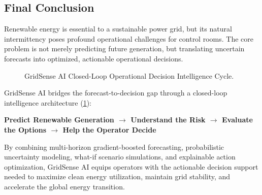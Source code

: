 \subsection{Final Conclusion}
\label{subsec:final_conclusion}

Renewable energy is essential to a sustainable power grid, but its natural intermittency poses profound operational challenges for control rooms. The core problem is not merely predicting future generation, but translating uncertain forecasts into optimized, actionable operational decisions.

\begin{figure}[htbp]
    \centering
    \caption{GridSense AI Closed-Loop Operational Decision Intelligence Cycle.}
    \label{fig:value_loop}
\end{figure}

GridSense AI bridges the forecast-to-decision gap through a closed-loop intelligence architecture (\cref{fig:value_loop}):
\begin{center}
    \textbf{\color{primaryNavy}Predict Renewable Generation $\longrightarrow$ Understand the Risk $\longrightarrow$ Evaluate the Options $\longrightarrow$ Help the Operator Decide}
\end{center}

By combining multi-horizon gradient-boosted forecasting, probabilistic uncertainty modeling, what-if scenario simulations, and explainable action optimization, GridSense AI equips operators with the actionable decision support needed to maximize clean energy utilization, maintain grid stability, and accelerate the global energy transition.
